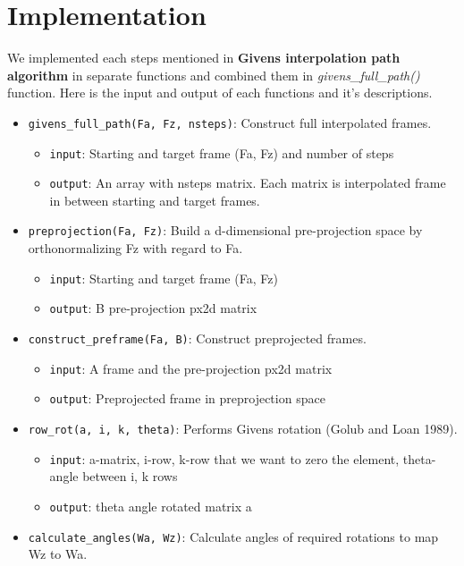 \hypertarget{implementation}{%
\section{Implementation}\label{implementation}}

We implemented each steps mentioned in \textbf{Givens interpolation path algorithm} in separate functions and combined them in \emph{givens\_full\_path()} function. Here is the input and output of each functions and it's descriptions.

\begin{itemize}
\tightlist
\item
  \texttt{givens\_full\_path(Fa,\ Fz,\ nsteps)}: Construct full interpolated frames.

  \begin{itemize}
  \tightlist
  \item
    \texttt{input}: Starting and target frame (Fa, Fz) and number of steps
  \item
    \texttt{output}: An array with nsteps matrix. Each matrix is interpolated frame in between starting and target frames.
  \end{itemize}
\item
  \texttt{preprojection(Fa,\ Fz)}: Build a d-dimensional pre-projection space by orthonormalizing Fz with regard to Fa.

  \begin{itemize}
  \tightlist
  \item
    \texttt{input}: Starting and target frame (Fa, Fz)
  \item
    \texttt{output}: B pre-projection px2d matrix
  \end{itemize}
\item
  \texttt{construct\_preframe(Fa,\ B)}: Construct preprojected frames.

  \begin{itemize}
  \tightlist
  \item
    \texttt{input}: A frame and the pre-projection px2d matrix
  \item
    \texttt{output}: Preprojected frame in preprojection space
  \end{itemize}
\item
  \texttt{row\_rot(a,\ i,\ k,\ theta)}: Performs Givens rotation (Golub and Loan 1989).

  \begin{itemize}
  \tightlist
  \item
    \texttt{input}: a-matrix, i-row, k-row that we want to zero the element, theta-angle between i, k rows
  \item
    \texttt{output}: theta angle rotated matrix a
  \end{itemize}
\item
  \texttt{calculate\_angles(Wa,\ Wz)}: Calculate angles of required rotations to map Wz to Wa.


\end{itemize}
